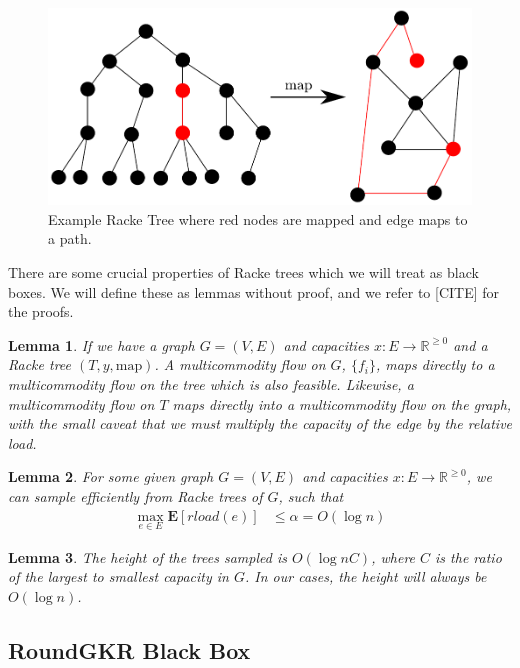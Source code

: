 \documentclass[12pt]{article}
\newtheorem{lemma}{Lemma}
\begin{document}
\begin{figure}
\label{fig:racketree}
\centering
\includegraphics[width=\linewidth]{Rackeembeddinggraph.pdf}
\caption{Example Racke Tree where red nodes are mapped and edge maps to a path.}
\end{figure}

There are some crucial properties of Racke trees which we will treat as black boxes. We will define these as lemmas without proof, and we refer to [CITE] for the proofs.

\begin{lemma}
\label{lem:mapflows}
If we have a graph $G = (V, E)$ and capacities $x: E \rightarrow \mathbb{R}^{\geq 0}$ and a Racke tree $(T, y, \text{map})$. A multicommodity flow on $G$, $\{ f_i \}$, maps directly to a multicommodity flow on the tree which is also feasible. Likewise, a multicommodity flow on $T$ maps directly into a multicommodity flow on the graph, with the small caveat that we must multiply the capacity of the edge by the relative load. 
\end{lemma}

\begin{lemma}
\label{lem:rload}
For some given graph $G = (V, E)$ and capacities $x: E \rightarrow \mathbb{R}^{\geq 0}$, we can sample efficiently from Racke trees of $G$, such that 
\begin{align}
\max_{e \in E} \textbf{E}[rload(e)] &\leq \alpha = O(\log n) 
\end{align}
\end{lemma}

\begin{lemma}
\label{thm:height}
The height of the trees sampled is $O(\log nC)$, where $C$ is the ratio of the largest to smallest capacity in $G$. In our cases, the height will always be $O(\log n)$. 
\end{lemma}

\subsection{RoundGKR Black Box}
\end{document}
